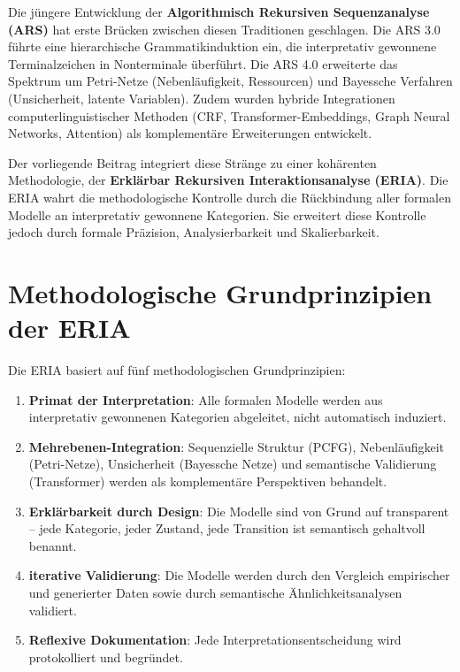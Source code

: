 \documentclass[12pt,a4paper]{article}
\begin{document}
Die jüngere Entwicklung der \textbf{Algorithmisch Rekursiven Sequenzanalyse (ARS)} 
hat erste Brücken zwischen diesen Traditionen geschlagen. Die ARS 3.0 führte eine 
hierarchische Grammatikinduktion ein, die interpretativ gewonnene Terminalzeichen 
in Nonterminale überführt. Die ARS 4.0 erweiterte das Spektrum um Petri-Netze 
(Nebenläufigkeit, Ressourcen) und Bayessche Verfahren (Unsicherheit, latente 
Variablen). Zudem wurden hybride Integrationen computerlinguistischer Methoden 
(CRF, Transformer-Embeddings, Graph Neural Networks, Attention) als komplementäre 
Erweiterungen entwickelt.

Der vorliegende Beitrag integriert diese Stränge zu einer kohärenten Methodologie, 
der \textbf{Erklärbar Rekursiven Interaktionsanalyse (ERIA)}. Die ERIA wahrt die 
methodologische Kontrolle durch die Rückbindung aller formalen Modelle an 
interpretativ gewonnene Kategorien. Sie erweitert diese Kontrolle jedoch durch 
formale Präzision, Analysierbarkeit und Skalierbarkeit.

\section{Methodologische Grundprinzipien der ERIA}

Die ERIA basiert auf fünf methodologischen Grundprinzipien:

\begin{enumerate}
    \item \textbf{Primat der Interpretation}: Alle formalen Modelle werden aus 
    interpretativ gewonnenen Kategorien abgeleitet, nicht automatisch induziert.
    
    \item \textbf{Mehrebenen-Integration}: Sequenzielle Struktur (PCFG), 
    Nebenläufigkeit (Petri-Netze), Unsicherheit (Bayessche Netze) und semantische 
    Validierung (Transformer) werden als komplementäre Perspektiven behandelt.
    
    \item \textbf{Erklärbarkeit durch Design}: Die Modelle sind von Grund auf 
    transparent – jede Kategorie, jeder Zustand, jede Transition ist semantisch 
    gehaltvoll benannt.
    
    \item \textbf{iterative Validierung}: Die Modelle werden durch den Vergleich 
    empirischer und generierter Daten sowie durch semantische Ähnlichkeitsanalysen 
    validiert.
    
    \item \textbf{Reflexive Dokumentation}: Jede Interpretationsentscheidung wird 
    protokolliert und begründet.
\end{enumerate}
\end{document}
